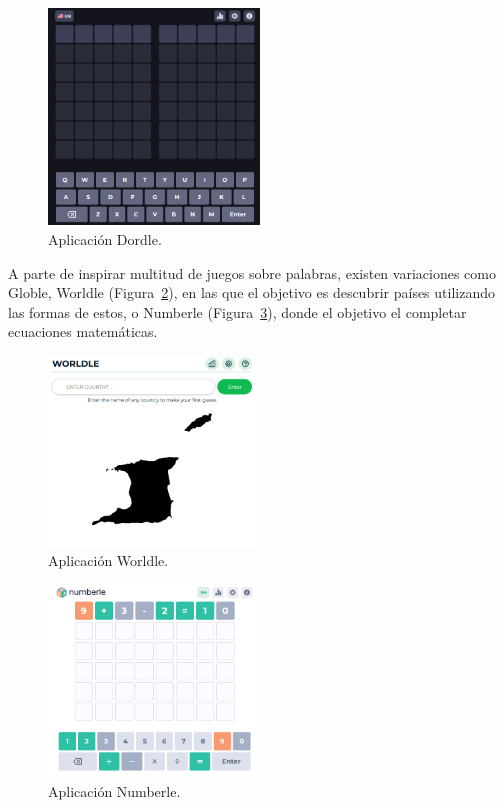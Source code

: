 \begin{figure}
	\centering
	\includegraphics[clip=true,width=0.5\textwidth]{images/dordle.png}
	\caption{Aplicación Dordle.}
	\label{fig:dordle_app}
\end{figure}


A parte de inspirar multitud de juegos sobre palabras, existen variaciones como Globle, Worldle (Figura~\ref{fig:worldle_app}), en las que el objetivo es descubrir países utilizando las formas de estos, o Numberle (Figura~\ref{fig:numberle_app}), donde el objetivo el completar ecuaciones matemáticas.

\begin{figure}
	\centering
	\includegraphics[clip=true,width=0.5\textwidth]{images/worldle.png}
	\caption{Aplicación Worldle.}
	\label{fig:worldle_app}
\end{figure}

\begin{figure}
	\centering
	\includegraphics[clip=true,width=0.5\textwidth]{images/numberle.png}
	\caption{Aplicación Numberle.}
	\label{fig:numberle_app}
\end{figure}



